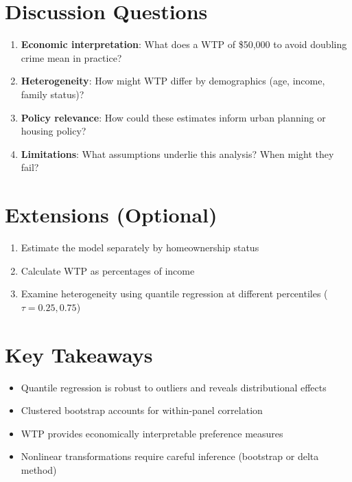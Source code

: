 \documentclass[12pt]{article}
\begin{document}
\section{Discussion Questions}

\begin{enumerate}
    \item \textbf{Economic interpretation}: What does a WTP of \$50,000 to avoid doubling crime mean in practice?
    
    \item \textbf{Heterogeneity}: How might WTP differ by demographics (age, income, family status)?
    
    \item \textbf{Policy relevance}: How could these estimates inform urban planning or housing policy?
    
    \item \textbf{Limitations}: What assumptions underlie this analysis? When might they fail?
\end{enumerate}

\section{Extensions (Optional)}

\begin{enumerate}
    \item Estimate the model separately by homeownership status
    \item Calculate WTP as percentages of income
    \item Examine heterogeneity using quantile regression at different percentiles ($\tau = 0.25, 0.75$)
\end{enumerate}

\section{Key Takeaways}

\begin{itemize}
    \item Quantile regression is robust to outliers and reveals distributional effects
    \item Clustered bootstrap accounts for within-panel correlation
    \item WTP provides economically interpretable preference measures
    \item Nonlinear transformations require careful inference (bootstrap or delta method)
\end{itemize}
\end{document}
